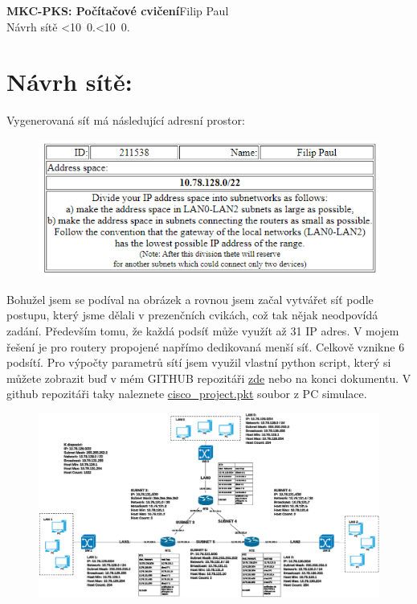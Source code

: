 \documentclass[10pt, a4paper]{article}%
\def\mydate{\leavevmode\hbox{\twodigits\day.\twodigits\month.\the\year}}
\def\twodigits#1{\ifnum#1<10 0\fi\the#1}
\begin{document}
\begin{flushleft}%
	\textbf{\Large{MKC-PKS: Počítačové cvičení}}\hfill Filip Paul\\
	\large{Návrh sítě \hfill\mydate}
	
\end{flushleft}
\section*{Návrh sítě:}
Vygenerovaná síť má následující adresní prostor:
		\begin{figure}[ht!]
			\centering
			\includegraphics[]{zadani.PNG}
		\end{figure}

Bohužel jsem se podíval na obrázek a rovnou jsem začal vytvářet síť podle postupu, který jsme dělali v prezenčních cvikách,
což tak nějak neodpovídá zadání. Především tomu, že každá podsíť může využít až 31 IP adres. V mojem řešení
je pro routery propojené napřímo dedikovaná menší síť. Celkově vznikne 6 podsítí.
Pro výpočty parametrů sítí jsem využil vlastní python script, který si můžete zobrazit buď v mém GITHUB repozitáři
\href{https://github.com/FilipPaul/ctvrtak_letni_semestr/blob/main/MKC_PKS/PC_cvika/README.md}{\color{blue} zde} nebo
na konci dokumentu. V github repozitáři taky naleznete
\href{https://github.com/FilipPaul/ctvrtak_letni_semestr/blob/main/MKC_PKS/PC_cvika/cisco_project.pkt}{\color{blue} cisco\_project.pkt}
soubor z PC simulace.

		\begin{figure}[ht!]
			\centering
			\includegraphics[width = 1\textwidth]{navrhSite.eps}
		\end{figure}	
\end{document}
